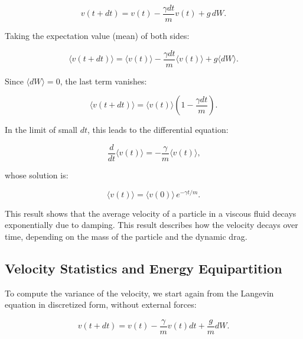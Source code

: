 \begin{equation}
  v(t + dt) = v(t) - \frac{\gamma dt}{m} v(t) + g\, dW\text{.}
  \label{eq:noforce}
\end{equation}

Taking the expectation value (mean) of both sides:

\begin{equation}
  \langle v(t + dt) \rangle = \langle v(t) \rangle - \frac{\gamma dt}{m} \langle v(t) \rangle + g \langle dW \rangle\text{.}
  \label{eq:mean}
\end{equation}

Since $\langle dW \rangle = 0$, the last term vanishes:

\begin{equation}
  \langle v(t + dt) \rangle = \langle v(t) \rangle \left( 1 - \frac{\gamma dt}{m} \right)\text{.}
  \label{eq:wienerproperties}
\end{equation}

In the limit of small $dt$, this leads to the differential equation:

\begin{equation}
  \frac{d}{dt} \langle v(t) \rangle = - \frac{\gamma}{m} \langle v(t) \rangle\text{,}
  \label{eq:derivative}
\end{equation}

whose solution is:

\begin{equation}
  \langle v(t) \rangle = \langle v(0) \rangle\, e^{-\gamma t / m}\text{.}
\end{equation}

This result shows that the average velocity of a particle in a viscous fluid decays exponentially due to damping. This result describes how the velocity decays over time, depending on the mass of the particle and the dynamic drag.


\subsection{Velocity Statistics and Energy Equipartition}

To compute the variance of the velocity, we start again from the Langevin equation in discretized form, without external forces:

\begin{equation}
  v(t + dt) = v(t) - \frac{\gamma}{m} v(t) dt + \frac{g}{m} dW \text{.}
\end{equation}

